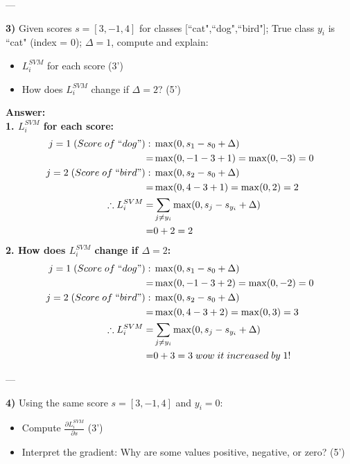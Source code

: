 \documentclass[12pt,a4paper]{article}
\begin{document}
	---
	
	\textbf{3)}  
	Given scores $s = [3,-1,4]$ for classes [``cat",``dog",``bird"]; True class $y_i$ is ``cat" (index = 0); $\Delta = 1$, compute and explain:
	\begin{itemize}[itemsep=0pt, topsep=0pt, parsep=0pt, partopsep=0pt]
		\item $L_i^{SVM}$ for each score (3’)
		\item How does $L_i^{SVM}$ change if $\Delta = 2$? (5’)
	\end{itemize}
	
	\textbf{Answer:}\\
	\textbf{1. $L_i^{SVM}$ for each score:}
	\begin{align}
		j=1\;(Score \; of \; ``dog"):\; &\max(0, s_1-s_0+\Delta)
		\\
		=&\max(0,-1-3+1)=\max(0,-3)=0
		\\
		j=2\;(Score \; of \; ``bird"):\; &\max(0, s_2-s_0+\Delta)
		\\
		=&\max(0,4-3+1)=\max(0,2)=2
		\\
		\therefore L_i^{SVM}=&\sum_{j\ne y_i}\max(0,s_j-s_{y_i}+\Delta)
		\\
		=&0+2=2
	\end{align}
	\textbf{2. How does $L_i^{SVM}$ change if $\Delta = 2$:}
	\begin{align}
		j=1\;(Score \; of \; ``dog"):\; &\max(0, s_1-s_0+\Delta)
		\\
		=&\max(0,-1-3+2)=\max(0,-2)=0
		\\
		j=2\;(Score \; of \; ``bird"):\; &\max(0, s_2-s_0+\Delta)
		\\
		=&\max(0,4-3+2)=\max(0,3)=3
		\\
		\therefore L_i^{SVM}=&\sum_{j\ne y_i}\max(0,s_j-s_{y_i}+\Delta)
		\\
		=&0+3=3\; wow \; it \; increased\; by\; 1!
	\end{align}
	
	---
	
	\textbf{4)}  
	Using the same score $s = [3,-1,4]$ and $y_i = 0$:
	\begin{itemize}[itemsep=0pt, topsep=0pt, parsep=0pt, partopsep=0pt]
		\item Compute $\frac{\partial L_i^{SVM}}{\partial s}$ (3’)
		\item Interpret the gradient: Why are some values positive, negative, or zero? (5’)
	\end{itemize}
	
\end{document}
